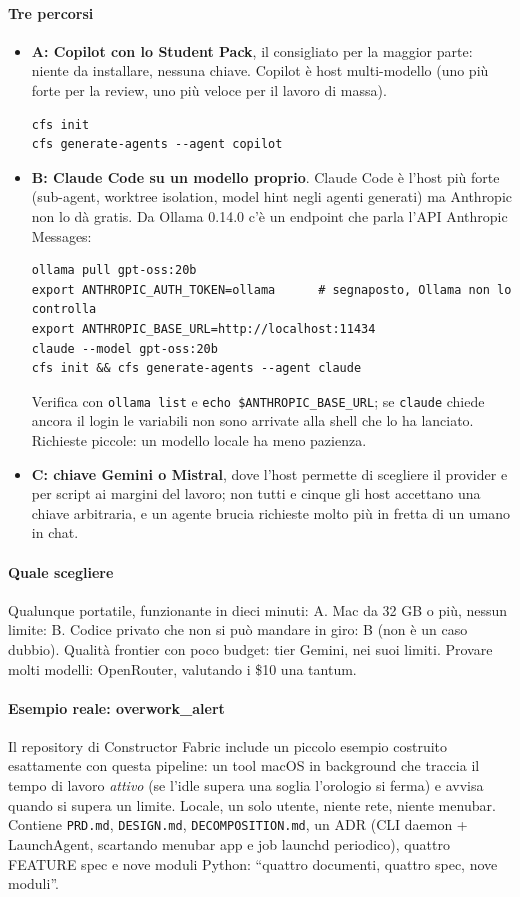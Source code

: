\documentclass[a4paper,12pt]{article}
\begin{document}
\paragraph{Tre percorsi}
\begin{itemize}
  \item \textbf{A: Copilot con lo Student Pack}, il consigliato per la maggior parte:
        niente da installare, nessuna chiave. Copilot è host multi-modello (uno più forte
        per la review, uno più veloce per il lavoro di massa).
\begin{verbatim}
cfs init
cfs generate-agents --agent copilot
\end{verbatim}
  \item \textbf{B: Claude Code su un modello proprio}. Claude Code è l'host più forte
        (sub-agent, worktree isolation, model hint negli agenti generati) ma Anthropic non
        lo dà gratis. Da Ollama 0.14.0 c'è un endpoint che parla l'API Anthropic Messages:
\begin{verbatim}
ollama pull gpt-oss:20b
export ANTHROPIC_AUTH_TOKEN=ollama      # segnaposto, Ollama non lo controlla
export ANTHROPIC_BASE_URL=http://localhost:11434
claude --model gpt-oss:20b
cfs init && cfs generate-agents --agent claude
\end{verbatim}
        Verifica con \texttt{ollama list} e \texttt{echo \$ANTHROPIC\_BASE\_URL}; se
        \texttt{claude} chiede ancora il login le variabili non sono arrivate alla shell
        che lo ha lanciato. Richieste piccole: un modello locale ha meno pazienza.
  \item \textbf{C: chiave Gemini o Mistral}, dove l'host permette di scegliere il
        provider e per script ai margini del lavoro; non tutti e cinque gli host accettano
        una chiave arbitraria, e un agente brucia richieste molto più in fretta di un
        umano in chat.
\end{itemize}

\paragraph{Quale scegliere} Qualunque portatile, funzionante in dieci minuti: A. Mac da
32 GB o più, nessun limite: B. Codice privato che non si può mandare in giro: B (non è
un caso dubbio). Qualità frontier con poco budget: tier Gemini, nei suoi limiti. Provare
molti modelli: OpenRouter, valutando i \$10 una tantum.

\paragraph{Esempio reale: overwork\_alert} Il repository di Constructor Fabric include un
piccolo esempio costruito esattamente con questa pipeline: un tool macOS in background che
traccia il tempo di lavoro \emph{attivo} (se l'idle supera una soglia l'orologio si ferma)
e avvisa quando si supera un limite. Locale, un solo utente, niente rete, niente menubar.
Contiene \texttt{PRD.md}, \texttt{DESIGN.md}, \texttt{DECOMPOSITION.md}, un ADR (CLI
daemon + LaunchAgent, scartando menubar app e job launchd periodico), quattro FEATURE
spec e nove moduli Python: ``quattro documenti, quattro spec, nove moduli''.
\end{document}
